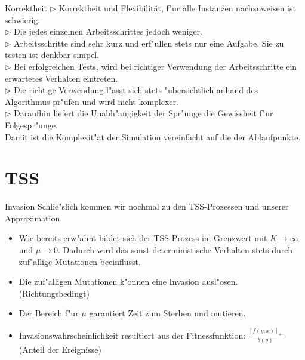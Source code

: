 \documentclass{beamer}
\begin{document}
\begin{frame}{Korrektheit}
$ \rhd $ Korrektheit und Flexibilität, f"ur alle Instanzen nachzuweisen ist schwierig.\smallskip\\\pause
$ \rhd $ Die jedes einzelnen Arbeitsschrittes jedoch weniger.\smallskip\\\pause
$ \rhd $ Arbeitsschritte sind sehr kurz und erf"ullen stets nur eine Aufgabe. Sie zu testen ist denkbar simpel.\smallskip\\\pause
$ \rhd $ Bei erfolgreichen Tests, wird bei richtiger Verwendung der Arbeitsschritte ein erwartetes Verhalten eintreten.\smallskip\\\pause
$ \rhd $ Die richtige Verwendung l"asst sich stets "ubersichtlich anhand des Algorithmus pr"ufen und wird nicht komplexer.\smallskip\\\pause
$ \rhd $ Daraufhin liefert die Unabh"angigkeit der Spr"unge die Gewissheit f"ur Folgespr"unge. \smallskip\\\pause
Damit ist die Komplexit"at der Simulation vereinfacht auf die der Ablaufpunkte.
\end{frame}

\section{TSS}
\begin{frame}{Invasion}
Schlie"slich kommen wir nochmal zu den TSS-Prozessen und unserer Approximation.\pause
	\begin{itemize}
		\item Wie bereits erw"ahnt bildet sich der TSS-Prozess im Grenzwert mit $ K\to \infty $ und $ \mu \to 0 $. Dadurch wird das sonst deterministische Verhalten stets durch zuf"allige Mutationen beeinflusst.\pause
		\item Die zuf"alligen Mutationen k"onnen eine Invasion ausl"osen. (Richtungsbedingt)\pause
		\item Der Bereich f"ur $ \mu $ garantiert Zeit zum Sterben und mutieren.\pause
		\item Invasionswahrscheinlichkeit resultiert aus der Fitnessfunktion: $ \frac{\left[ f(y,x)\right]_+ }{b(y)} $ (Anteil der Ereignisse)
	\end{itemize}
\end{frame}
\end{document}
